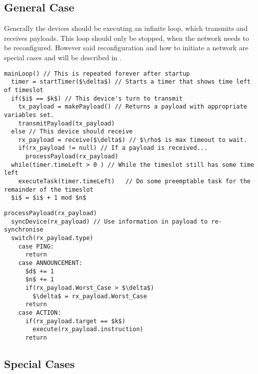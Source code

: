 \subsection{General Case} %
\label{sub:general_case}
Generally the devices should be executing an infinite loop, which transmits and receives payloads.
This loop should only be stopped, when the network needs to be reconfigured.
However said reconfiguration and how to initiate a network are special cases and will be described in .

\begin{lstlisting}[style=customc,mathescape=true,caption={Pseudocode example of the main loop}]  
mainLoop() // This is repeated forever after startup
  timer = startTimer($\delta$) // Starts a timer that shows time left of timeslot
  if($i$ == $k$) // This device's turn to transmit
  	tx_payload = makePayload() // Returns a payload with appropriate variables set.
  	transmitPayload(tx_payload)
  else // This device should receive
  	rx_payload = receive($\delta$) // $\rho$ is max timeout to wait. 
  	if(rx_payload != null) // If a payload is received...
  	  processPayload(rx_payload)
  while(timer.timeLeft > 0 ) // While the timeslot still has some time left
    executeTask(timer.timeLeft)   // Do some preemptable task for the remainder of the timeslot
  $i$ = $i$ + 1 mod $n$   
\end{lstlisting}  

\begin{lstlisting}[style=customc,mathescape=true,caption={Pseudocode example of the method that processes the payload}]  
processPayload(rx_payload)
  syncDevice(rx_payload) // Use information in payload to re-synchronise
  switch(rx_payload.type)
    case PING:
      return
    case ANNOUNCEMENT:
      $d$ += 1
      $n$ += 1
      if(rx_payload.Worst_Case > $\delta$)
        $\delta$ = rx_payload.Worst_Case
      return
    case ACTION:
      if(rx_payload.target == $k$)
        execute(rx_payload.instruction)
      return         
\end{lstlisting}

\subsection{Special Cases} %
\label{sub:special_cases} 


